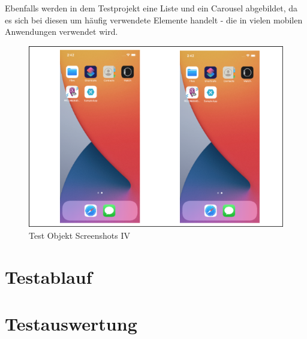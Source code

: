 Ebenfalls werden in dem Testprojekt eine Liste und ein Carousel abgebildet,  da es sich bei diesen um häufig verwendete Elemente handelt - die in vielen mobilen Anwendungen verwendet wird. 

\begin{figure}[!ht]
 \includegraphics[width=\textwidth,keepaspectratio]{Images/Screenshot/AppIconAndMenu.png}
 \caption{Test Objekt Screenshots IV}
 \label{fig:TestObjectI}
\end{figure}




\section{Testablauf}




\section{Testauswertung}


